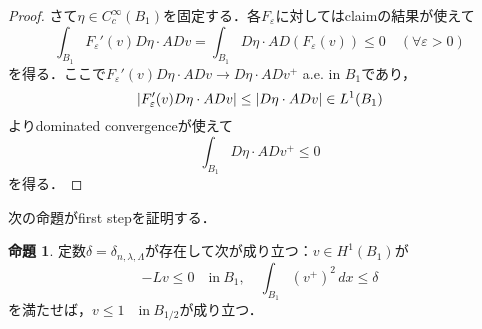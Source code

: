 \documentclass[a4paper]{ltjsarticle}
\newcommand{\inn}{\quad\text{in}\ }
\newcommand{\1}{\mathbbm{1}}
\numberwithin{equation}{section}
\theoremstyle{definition}
\newtheorem{prop}[thm]{命題}
\begin{document}
\begin{proof}
    さて$\eta\in C^{\infty}_{c}(B_1)$を固定する．各$F_{\varepsilon}$に対してはclaimの結果が使えて
    \begin{equation}
        \int_{B_1}F_{\varepsilon}'(v)D\eta\cdot ADv=\int_{B_1}D\eta\cdot AD(F_{\varepsilon}(v))\leq 0\quad (\forall \varepsilon>0)
    \end{equation}
    を得る．ここで$F_{\varepsilon}'(v)D\eta\cdot ADv\to D\eta\cdot ADv^+$ a.e. in $B_1$であり，
    \begin{equation}
        \abs{F_{\varepsilon}'(v)D\eta\cdot ADv}\leq \abs{D\eta\cdot ADv}\in L^1(B_1)
    \end{equation}
    よりdominated convergenceが使えて
    \begin{equation}
        \int_{B_1}D\eta\cdot ADv^+\leq0
    \end{equation}
    を得る．
\end{proof}
次の命題がfirst stepを証明する．
\begin{prop}
    定数$\delta=\delta_{n,\lambda,\Lambda}$が存在して次が成り立つ：$v\in H^1(B_1)$が
    \begin{equation}
        -Lv\leq0\inn B_1,\quad \int_{B_1}(v^+)^2\,dx\leq \delta 
    \end{equation}
    を満たせば，$v\leq1\inn B_{1/2}$が成り立つ．
\end{prop}
\end{document}
